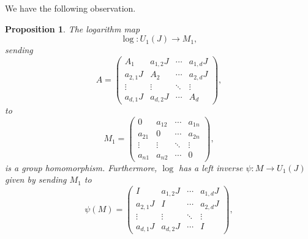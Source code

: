 \documentclass[12pt, a4paper]{amsart}
\numberwithin{equation}{section} %
\theoremstyle{plain}
\theoremstyle{definition}
\theoremstyle{plain}
\newtheorem{prop}[thm]{Proposition}
\theoremstyle{remark}
\newcommand{\ones}{J}
\begin{document}
We have the following observation.
\begin{prop}
The logarithm map 
\[ \log: U_1(J) \to M_1 ,\]
sending
\begin{equation*}
A=\left(\begin{array}{c|c|c|c}
A_1 & a_{1,2}\ones & \cdots & a_{1,d}\ones \\
\hline
a_{2,1}\ones & A_2 & \cdots & a_{2,d}\ones \\
\hline
\vdots & \vdots & \ddots & \vdots \\
\hline
a_{d,1}\ones & a_{d,2}\ones & \cdots & A_d
\end{array}\right),
\end{equation*}
to 
\[ M_1= \begin{pmatrix}
0 & a_{12} & \cdots & a_{1n} \\
a_{21} & 0 & \cdots & a_{2n} \\
\vdots  & \vdots  & \ddots & \vdots  \\
a_{n1} & a_{n2} & \cdots & 0 \end{pmatrix} ,\]
is a group homomorphism. Furthermore, $\log$ 
has a left inverse $\psi: M \to U_1(J)$ given by sending $M_1$ to 
\begin{equation*}
\psi(M)=\left(\begin{array}{c|c|c|c}
I & a_{1,2}\ones & \cdots & a_{1,d}\ones \\
\hline
a_{2,1}\ones & I & \cdots & a_{2,d}\ones \\
\hline
\vdots & \vdots & \ddots & \vdots \\
\hline
a_{d,1}\ones & a_{d,2}\ones & \cdots & I
\end{array}\right),
\end{equation*}

\end{prop}
\end{document}
